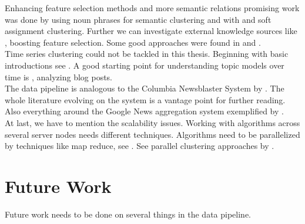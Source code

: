 Enhancing feature selection methods and more semantic relations promising work was done by \cite{NounPhraseSemanticClustering2009} using noun phrases for semantic clustering and 
\cite{WordNetAndFuzzyAssociation2010} with \wordnet{} and soft assignment clustering. Further we can investigate external knowledge sources like \wiki{}, boosting feature selection. Some good approaches were found in \cite{WikipediaClusteringSim2009} and \cite{WikipediaClustering2010}.\\

Time series clustering could not be tackled in this thesis. Beginning with basic introductions see \cite{ClusteringTimesSeriesSurves2005, RecentTechniquesClusteringSurvey2012, IncrementalClustering2012}. A good starting point for understanding topic models over time is \cite{BlogTopicLDA2013}, analyzing blog posts.\\

The data pipeline is analogous to the Columbia Newsblaster System by \cite{NewsBlaster2002}. The whole literature evolving on the system is a vantage point for further reading. Also everything around the Google News aggregation system exemplified by \cite{GoogleNews2007}.\\

At last, we have to mention the scalability issues. Working with algorithms across several server nodes needs different techniques. Algorithms need to be parallelized by techniques like map reduce, see \cite{MapReduce2008}. See parallel clustering approaches by \cite{ParallelClustering2009}.

\section{Future Work}
\label{sec:future_work}
Future work needs to be done on several things in the data pipeline.

